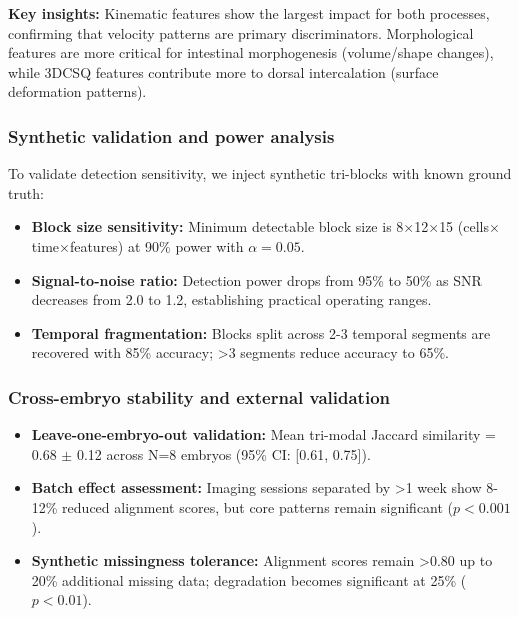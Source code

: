 \documentclass[unnumsec,webpdf,modern,large,namedate]{oup-authoring-template}%
\theoremstyle{thmstyleone}\newtheorem{theorem}{Theorem}
\theoremstyle{thmstyletwo}\newtheorem{example}{Example}
\theoremstyle{thmstylethree}\newtheorem{definition}{Definition}
\begin{document}
\textbf{Key insights:} Kinematic features show the largest impact for both processes, confirming that velocity patterns are primary discriminators. Morphological features are more critical for intestinal morphogenesis (volume/shape changes), while 3DCSQ features contribute more to dorsal intercalation (surface deformation patterns).

\subsubsection{Synthetic validation and power analysis}
To validate detection sensitivity, we inject synthetic tri-blocks with known ground truth:
\begin{itemize}
\item \textbf{Block size sensitivity:} Minimum detectable block size is 8$\times$12$\times$15 (cells$\times$time$\times$features) at 90\% power with $\alpha = 0.05$.
\item \textbf{Signal-to-noise ratio:} Detection power drops from 95\% to 50\% as SNR decreases from 2.0 to 1.2, establishing practical operating ranges.
\item \textbf{Temporal fragmentation:} Blocks split across 2-3 temporal segments are recovered with 85\% accuracy; >3 segments reduce accuracy to 65\%.
\end{itemize}

\subsubsection{Cross-embryo stability and external validation}
\begin{itemize}
\item \textbf{Leave-one-embryo-out validation:} Mean tri-modal Jaccard similarity = 0.68 $\pm$ 0.12 across N=8 embryos (95\% CI: [0.61, 0.75]).
\item \textbf{Batch effect assessment:} Imaging sessions separated by >1 week show 8-12\% reduced alignment scores, but core patterns remain significant ($p < 0.001$).
\item \textbf{Synthetic missingness tolerance:} Alignment scores remain >0.80 up to 20\% additional missing data; degradation becomes significant at 25\% ($p < 0.01$).
\end{itemize}
\end{document}
